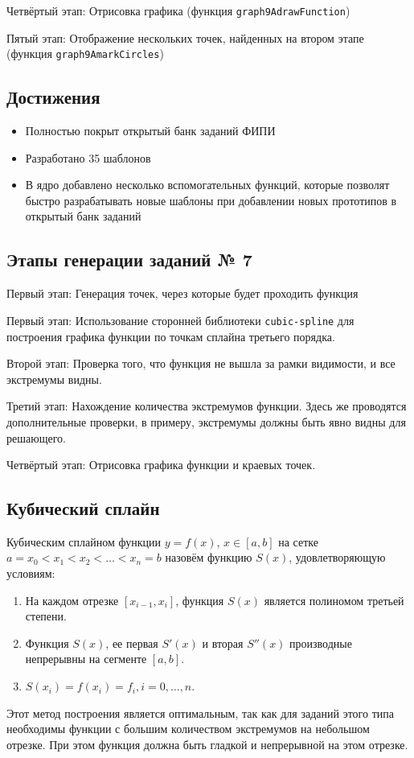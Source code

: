 \documentclass[a4paper, 12pt]{extarticle}
\begin{document}
Четвёртый этап: Отрисовка графика (функция \texttt{graph9AdrawFunction})

Пятый этап: Отображение нескольких точек, найденных на втором этапе (функция \texttt{graph9AmarkCircles})

\subsection*{Достижения}
\begin{itemize}
    \item Полностью покрыт открытый банк заданий ФИПИ
    \item Разработано 35 шаблонов
    \item В ядро добавлено несколько вспомогательных функций, которые позволят быстро разрабатывать новые шаблоны при добавлении новых прототипов в открытый банк заданий
\end{itemize}

\subsection*{Этапы генерации заданий № 7}
    Первый этап: Генерация точек, через которые будет проходить функция
        
    Первый этап: Использование сторонней библиотеки \texttt{cubic-spline} для построения графика функции по точкам сплайна третьего порядка.
        
    Второй этап: Проверка того, что функция не вышла за рамки видимости, и все экстремумы видны. %
    
    Третий этап: Нахождение количества экстремумов функции.
    Здесь же проводятся дополнительные проверки, в примеру, экстремумы должны быть явно видны для решающего. 
        
    Четвёртый этап: Отрисовка графика функции и краевых точек.
    
\subsection*{Кубический сплайн}

Кубическим сплайном функции $y = f(x)$, $x\in[a, b]$ на сетке $a=x_0<x_1<x_2< \dots <x_n=b$ назовём функцию $S(x)$, удовлетворяющую условиям:
    \begin{enumerate}
        \item На каждом отрезке $[x_{i-1},x_i]$, функция $S(x)$ является полиномом третьей степени.
        \item Функция $S(x)$, ее первая $S'(x)$ и вторая $S''(x)$ производные непрерывны на сегменте $[a, b]$.
        \item $S(x_i)=f(x_i)=f_i, i=0,\dots,n$.
\end{enumerate}

Этот метод построения является оптимальным, так как для заданий этого типа необходимы функции с большим количеством экстремумов на небольшом отрезке. При этом функция должна быть гладкой и непрерывной на этом отрезке.  
\end{document}
